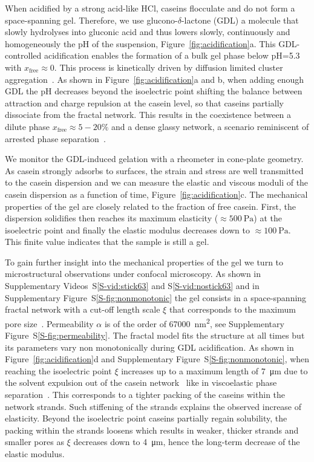 \documentclass[twocolumn,superscriptaddress,showpacs,preprintnumbers, amsmath,amssymb,prl]{revtex4-1}
\begin{document}

When acidified by a strong acid-like HCl, caseins flocculate and do not form a space-spanning gel. Therefore, we use glucono-$\delta$-lactone (GDL) a molecule that slowly hydrolyses into gluconic acid and thus lowers slowly, continuously and homogeneously the pH of the suspension, Figure~\ref{fig:acidification}a. This GDL-controlled acidification enables the formation of a bulk gel phase below pH=5.3 with $x_\text{free}\approx 0$. This process is kinetically driven by diffusion limited cluster aggregation~\cite{Bremer1989}. As shown in Figure~\ref{fig:acidification}a and b, when adding enough GDL the pH decreases beyond the isoelectric point shifting the balance between attraction and charge repulsion at the casein level, so that caseins partially dissociate from the fractal network. This results in the coexistence between a dilute phase $x_\text{free}\approx 5-20\%$ and a dense glassy network, a scenario reminiscent of arrested phase separation~\cite{Cardinaux2007,lu2008gelation}.

We monitor the GDL-induced gelation with a rheometer in cone-plate geometry. As casein strongly adsorbs to surfaces, the strain and stress are well transmitted to the casein dispersion and we can measure the elastic and viscous moduli of the casein dispersion as a function of time, Figure~\ref{fig:acidification}c. The mechanical properties of the gel are closely related to the fraction of free casein. First, the dispersion solidifies then reaches its maximum elasticity ($\approx\SI{500}{\pascal}$) at the isoelectric point and finally the elastic modulus decreases down to $\approx\SI{100}{\pascal}$. This finite value indicates that the sample is still a gel.

To gain further insight into the mechanical properties of the gel we turn to microstructural observations under confocal microscopy. As shown in Supplementary Videos~S\ref{S-vid:stick63} and S\ref{S-vid:nostick63} and in Supplementary Figure~S\ref{S-fig:nonmonotonic} the gel consists in a space-spanning fractal network with a cut-off length scale $\xi$ that corresponds to the maximum pore size~\cite{VanDijk1986}. Permeability $\alpha$ is of the order of \SI{67000}{\square\nano\metre}, see Supplementary Figure~S\ref{S-fig:permeability}. The fractal model fits the structure at all times but its parameters vary non monotonically during GDL acidification. As shown in Figure~\ref{fig:acidification}d and Supplementary Figure~S\ref{S-fig:nonmonotonic}, when reaching the isoelectric point $\xi$ increases up to a maximum length of \SI{7}{\micro\metre} due to the solvent expulsion out of the casein network~\cite{Lucey1998} like in viscoelastic phase separation~\cite{Tanaka2000h}. This corresponds to a tighter packing of the caseins within the network strands. Such stiffening of the strands explains the observed increase of elasticity. Beyond the isoelectric point caseins partially regain solubility, the packing within the strands loosens which results in weaker, thicker strands and smaller pores as $\xi$ decreases down to \SI{4}{\micro\metre}, hence the long-term decrease of the elastic modulus.
\end{document}

